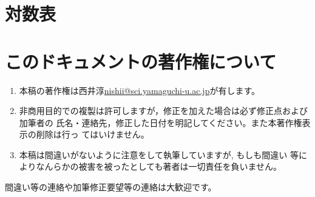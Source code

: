 \documentclass[twocolumn,11pt]{jarticle}
\begin{document}


\rule{0pt}{10cm}
\newpage

\appendix
\section{対数表\label{app:ln}}


\newpage

\vspace*{1cm}
\newpage

\section{このドキュメントの著作権について}

\begin{enumerate}
\item 本稿の著作権は西井淳\url{nishii@sci.yamaguchi-u.ac.jp}が有します。
\item 非商用目的での複製は許可しますが，修正を加えた場合は必ず修正点および加筆者の
氏名・連絡先，修正した日付を明記してください。また本著作権表示の削除は行っ
てはいけません。
\item 本稿は間違いがないように注意をして執筆していますが, もしも間違い
  等によりなんらかの被害を被ったとしても著者は一切責任を負いません。
\end{enumerate}
間違い等の連絡や加筆修正要望等の連絡は大歓迎です。



\printindex
\end{document}
